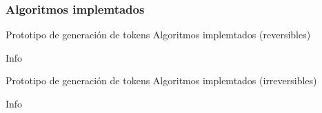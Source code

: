 %
%
%

\subsubsection{Algoritmos implemtados}

\begin{frame}{Prototipo de generación de tokens}
{Algoritmos implemtados (reversibles)}
  
  Info


\end{frame}

\begin{frame}{Prototipo de generación de tokens}
{Algoritmos implemtados (irreversibles)}
  
  Info


\end{frame}
